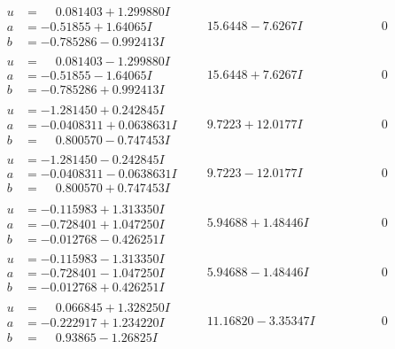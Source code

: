 \documentclass[1p]{elsarticle_modified}
\theoremstyle{definition}
\begin{document}
$$\begin{array}{c|c|c}
\begin{aligned}
u &= \phantom{-}0.081403 + 1.299880 I \\
a &= -0.51855 + 1.64065 I \\
b &= -0.785286 - 0.992413 I\end{aligned}
 & \phantom{-}15.6448 - 7.6267 I & \phantom{-0.000000 } 0 \\ \hline\begin{aligned}
u &= \phantom{-}0.081403 - 1.299880 I \\
a &= -0.51855 - 1.64065 I \\
b &= -0.785286 + 0.992413 I\end{aligned}
 & \phantom{-}15.6448 + 7.6267 I & \phantom{-0.000000 } 0 \\ \hline\begin{aligned}
u &= -1.281450 + 0.242845 I \\
a &= -0.0408311 + 0.0638631 I \\
b &= \phantom{-}0.800570 - 0.747453 I\end{aligned}
 & \phantom{-}9.7223 + 12.0177 I & \phantom{-0.000000 } 0 \\ \hline\begin{aligned}
u &= -1.281450 - 0.242845 I \\
a &= -0.0408311 - 0.0638631 I \\
b &= \phantom{-}0.800570 + 0.747453 I\end{aligned}
 & \phantom{-}9.7223 - 12.0177 I & \phantom{-0.000000 } 0 \\ \hline\begin{aligned}
u &= -0.115983 + 1.313350 I \\
a &= -0.728401 + 1.047250 I \\
b &= -0.012768 - 0.426251 I\end{aligned}
 & \phantom{-}5.94688 + 1.48446 I & \phantom{-0.000000 } 0 \\ \hline\begin{aligned}
u &= -0.115983 - 1.313350 I \\
a &= -0.728401 - 1.047250 I \\
b &= -0.012768 + 0.426251 I\end{aligned}
 & \phantom{-}5.94688 - 1.48446 I & \phantom{-0.000000 } 0 \\ \hline\begin{aligned}
u &= \phantom{-}0.066845 + 1.328250 I \\
a &= -0.222917 + 1.234220 I \\
b &= \phantom{-}0.93865 - 1.26825 I\end{aligned}
 & \phantom{-}11.16820 - 3.35347 I & \phantom{-0.000000 } 0 \\ \hline\begin{aligned}

\end{aligned}
\end{array}$$
\end{document}
